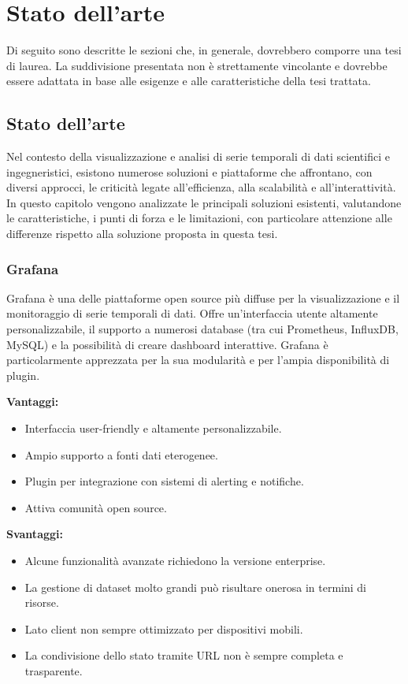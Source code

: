 \clearpage{\pagestyle{empty}\cleardoublepage}
\chapter{Stato dell'arte}
\label{chap:stato_arte}

Di seguito sono descritte le sezioni che, in generale, dovrebbero comporre una tesi di laurea. La suddivisione presentata non è strettamente vincolante e dovrebbe essere adattata in base alle esigenze e alle caratteristiche della tesi trattata.

\section{Stato dell'arte}

Nel contesto della visualizzazione e analisi di serie temporali di dati scientifici e ingegneristici, esistono numerose soluzioni e piattaforme che affrontano, con diversi approcci, le criticità legate all’efficienza, alla scalabilità e all’interattività. In questo capitolo vengono analizzate le principali soluzioni esistenti, valutandone le caratteristiche, i punti di forza e le limitazioni, con particolare attenzione alle differenze rispetto alla soluzione proposta in questa tesi.

\subsection{Grafana}

Grafana è una delle piattaforme open source più diffuse per la visualizzazione e il monitoraggio di serie temporali di dati. Offre un’interfaccia utente altamente personalizzabile, il supporto a numerosi database (tra cui Prometheus, InfluxDB, MySQL) e la possibilità di creare dashboard interattive. Grafana è particolarmente apprezzata per la sua modularità e per l’ampia disponibilità di plugin.

\textbf{Vantaggi:}
\begin{itemize}
    \item Interfaccia user-friendly e altamente personalizzabile.
    \item Ampio supporto a fonti dati eterogenee.
    \item Plugin per integrazione con sistemi di alerting e notifiche.
    \item Attiva comunità open source.
\end{itemize}

\textbf{Svantaggi:}
\begin{itemize}
    \item Alcune funzionalità avanzate richiedono la versione enterprise.
    \item La gestione di dataset molto grandi può risultare onerosa in termini di risorse.
    \item Lato client non sempre ottimizzato per dispositivi mobili.
    \item La condivisione dello stato tramite URL non è sempre completa e trasparente.
\end{itemize}

